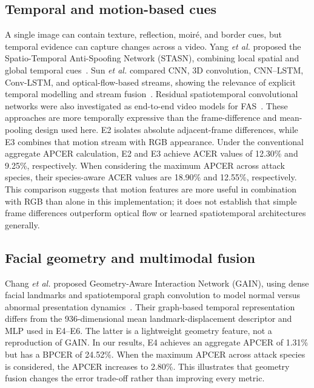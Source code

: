 \documentclass[a4paper,conference]{IEEEtran}
\begin{document}
\subsection{Temporal and motion-based cues}
A single image can contain texture, reflection, moir\'e, and border cues, but temporal evidence can capture changes across a video. Yang \emph{et al.} proposed the Spatio-Temporal Anti-Spoofing Network (STASN), combining local spatial and global temporal cues~\cite{yang2019stasn}. Sun \emph{et al.} compared CNN, 3D convolution, CNN--LSTM, Conv-LSTM, and optical-flow-based streams, showing the relevance of explicit temporal modelling and stream fusion~\cite{sun2018temporal}. Residual spatiotemporal convolutional networks were also investigated as end-to-end video models for FAS~\cite{silva2023spatiotemporal}. These approaches are more temporally expressive than the frame-difference and mean-pooling design used here. E2 isolates absolute adjacent-frame differences, while E3 combines that motion stream with RGB appearance. Under the conventional aggregate APCER calculation, E2 and E3
achieve ACER values of 12.30\% and 9.25\%, respectively.
When considering the maximum APCER across attack species,
their species-aware ACER values are 18.90\% and 12.55\%,
respectively. This comparison suggests that motion features
are more useful in combination with RGB than alone in this
implementation; it does not establish that simple frame
differences outperform optical flow or learned
spatiotemporal architectures generally.

\subsection{Facial geometry and multimodal fusion}
Chang \emph{et al.} proposed Geometry-Aware Interaction Network (GAIN), using dense facial landmarks and spatiotemporal graph convolution to model normal versus abnormal presentation dynamics~\cite{chang2023geometry}. Their graph-based temporal representation differs from the 936-dimensional mean landmark-displacement descriptor and MLP used in E4--E6. The latter is a lightweight geometry feature, not a reproduction of GAIN. In our results, E4 achieves an aggregate APCER of 1.31\% but has a BPCER of 24.52\%. When the maximum APCER across attack species is considered, the APCER increases to 2.80\%. This illustrates that geometry fusion changes the error trade-off rather than improving every metric.
\end{document}
